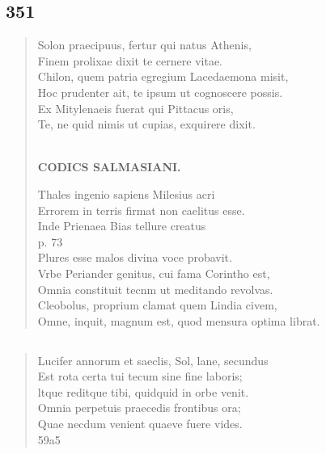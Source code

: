 \documentclass[11pt, a4paper]{report}
\begin{document}
            \subsection*{351}
      \begin{verse}
      Solon praecipuus, fertur qui natus Athenis, \\ Finem prolixae dixit te cernere vitae. \\ Chilon, quem patria egregium Lacedaemona misit, \\ Hoc prudenter ait, te ipsum ut cognoscere possis. \\ Ex Mitylenaeis fuerat qui Pittacus oris, \\ Te, ne quid nimis ut cupias, exquirere dixit. \\ 
        ﻿\pagebreak 
    \begin{center} \textbf{CODICS SALMASIANI.} \end{center}Thales ingenio sapiens Milesius acri \\ Errorem in terris firmat non caelitus esse. \\ Inde Prienaea Bias tellure creatus \\ p. 73 \\ Plures esse malos divina voce probavit. \\ Vrbe Periander genitus, cui fama Corintho est, \\ Omnia constituit tecnm ut meditando revolvas. \\ Cleobolus, proprium clamat quem Lindia civem, \\ Omne, inquit, magnum est, quod mensura optima librat. \\ 
      \end{verse}
  
            \subsection*{}
      \begin{verse}
      Lucifer annorum et saeclis, Sol, lane, secundus \\ Est rota certa tui tecum sine fine laboris; \\ ltque reditque tibi, quidquid in orbe venit. \\ Omnia perpetuis praecedis frontibus ora; \\ Quae necdum venient quaeve fuere vides. \\ 59a5 \\ 
      \end{verse}
  
\end{document}
